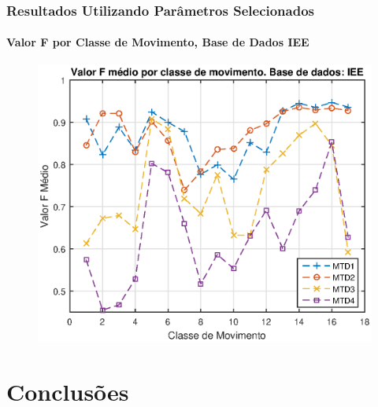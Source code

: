 \documentclass{beamer}
\begin{document}
	\begin{frame}
		\frametitle{Resultados Utilizando Parâmetros Selecionados}
		\framesubtitle{Valor F por Classe de Movimento, Base de Dados IEE}
		
		\begin{figure}
			\begin{center}
				\includegraphics[width=\textwidth]{./img/fvalue_iee.eps}
			\end{center}
		\end{figure}
		
	\end{frame}
	
	\section[Conclusões]{Conclusões}
\end{document}
